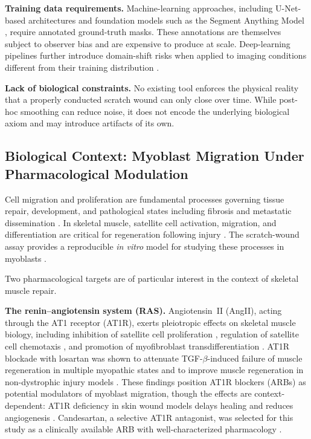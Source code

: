 \textbf{Training data requirements.}
Machine-learning approaches, including U-Net-based architectures
\citep{Ronneberger2015,Dogru2024,Naser2025}
and foundation models such as the Segment Anything Model \citep{Lehmann2024},
require annotated ground-truth masks.
These annotations are themselves subject to observer bias and are expensive to produce at scale.
Deep-learning pipelines further introduce domain-shift risks when applied to imaging conditions
different from their training distribution \citep{Oldenburg2021}.

\textbf{Lack of biological constraints.}
No existing tool enforces the physical reality that a properly conducted scratch wound can only
close over time.
While post-hoc smoothing can reduce noise, it does not encode the underlying biological axiom
and may introduce artifacts of its own.

\subsection{Biological Context: Myoblast Migration Under Pharmacological Modulation}

Cell migration and proliferation are fundamental processes governing tissue repair,
development, and pathological states including fibrosis and metastatic dissemination
\citep{Haeger2013,Ele2020}.
In skeletal muscle, satellite cell activation, migration, and differentiation are critical for
regeneration following injury \citep{Goetsch2013,Webster2013,Kowalski2017}.
The scratch-wound assay provides a reproducible \emph{in vitro} model for studying these
processes in myoblasts \citep{Goetsch2011}.

Two pharmacological targets are of particular interest in the context of skeletal muscle repair.

\textbf{The renin--angiotensin system (RAS).}
Angiotensin~II (AngII), acting through the AT1 receptor (AT1R), exerts pleiotropic effects on
skeletal muscle biology, including inhibition of satellite cell proliferation
\citep{Yoshida2013}, regulation of satellite cell chemotaxis \citep{Yoshida2010},
and promotion of myofibroblast transdifferentiation \citep{Lemos2019}.
AT1R blockade with losartan was shown to attenuate TGF-$\beta$-induced failure of muscle
regeneration in multiple myopathic states \citep{Cohn2007} and to improve muscle regeneration
in non-dystrophic injury models \citep{Bedair2008}.
These findings position AT1R blockers (ARBs) as potential modulators of myoblast migration,
though the effects are context-dependent: AT1R deficiency in skin wound models delays healing
and reduces angiogenesis \citep{Kurosaka2009}.
Candesartan, a selective AT1R antagonist, was selected for this study as a clinically available
ARB with well-characterized pharmacology \citep{Cabello2015}.

